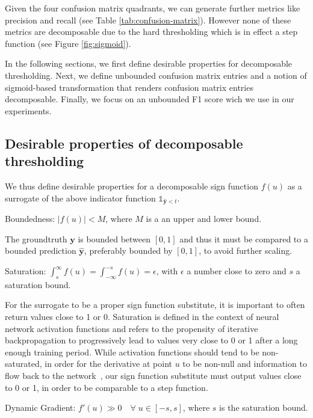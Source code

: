 Given the four confusion matrix quadrants, we can generate further metrics like precision and recall (see Table \ref{tab:confusion-matrix}). However none of these metrics are decomposable due to the hard thresholding which is in effect a step function (see Figure \ref{fig:sigmoid}).

In the following sections, we first define desirable properties for decomposable thresholding.
Next, we define unbounded confusion matrix entries and a notion of sigmoid-based transformation that renders confusion matrix entries decomposable. Finally, we focus on an unbounded F1 score wich we use in our experiments.

\subsection{Desirable properties of decomposable thresholding}

We thus define desirable properties for a decomposable sign function $f(u)$ as a surrogate of the above indicator function \(\mathds{1}_{\hat{\mathbf{y}} < t}\).

\begin{prop}
  Boundedness: $|f(u)| < M$, where $M$ is a an upper and lower bound.
\end{prop}
The groundtruth $\mathbf{y}$ is bounded between $[0,1]$ and thus it must be compared to a bounded prediction $\mathbf{\hat{y}}$, preferably bounded by $[0,1]$, to avoid further scaling.

\begin{prop}
  Saturation: $\int_{s}^{\infty} f(u) = \int_{-\infty}^{-s} f(u) = \epsilon$, with $\epsilon$ a number close to zero and $s$ a saturation bound.
\end{prop}
For the surrogate to be a proper sign function substitute, it is important to often return values close to 1 or 0. Saturation is defined in the context of neural network activation functions and refers to the propensity of iterative backpropagation to progressively lead to values very close to 0 or 1 after a long enough training period. While activation functions should tend to be non-saturated, in order for the derivative at point $u$ to be non-null and information to flow back to the network~\cite{saturation}, our sign function substitute must output values close to 0 or 1, in order to be comparable to a step function.

\begin{prop}
  Dynamic Gradient: $f'(u) \gg 0 \quad \forall \; u \in [-s, s]$, where $s$ is the saturation bound.
\end{prop}

